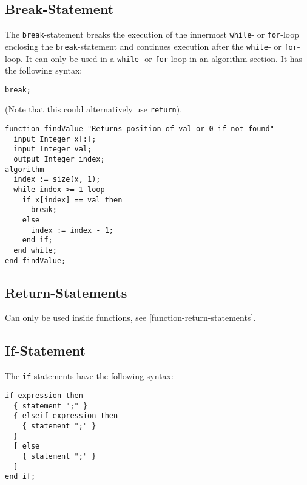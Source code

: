 \subsection{Break-Statement}\label{break-statement}

The \lstinline!break!-statement breaks the execution of the innermost \lstinline!while!- or \lstinline!for!-loop enclosing the \lstinline!break!-statement and continues execution after the \lstinline!while!- or \lstinline!for!-loop.
It can only be used in a \lstinline!while!- or \lstinline!for!-loop in an algorithm section.
It has the following syntax:
\begin{lstlisting}[language=modelica]
break;
\end{lstlisting}

\begin{example}
(Note that this could alternatively use \lstinline!return!).
\begin{lstlisting}[language=modelica]
function findValue "Returns position of val or 0 if not found"
  input Integer x[:];
  input Integer val;
  output Integer index;
algorithm
  index := size(x, 1);
  while index >= 1 loop
    if x[index] == val then
      break;
    else
      index := index - 1;
    end if;
  end while;
end findValue;
\end{lstlisting}
\end{example}

\subsection{Return-Statements}\label{return-statements}

Can only be used inside functions, see \cref{function-return-statements}.

\subsection{If-Statement}\label{if-statement}

The \lstinline!if!-statements have the following syntax:
\begin{lstlisting}[language=grammar]
if expression then
  { statement ";" }
  { elseif expression then
    { statement ";" }
  }
  [ else
    { statement ";" }
  ]
end if;
\end{lstlisting}

